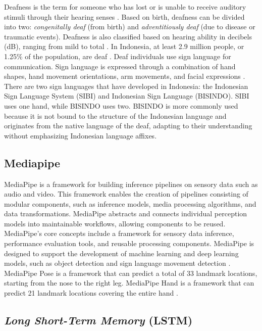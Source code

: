 Deafness is the term for someone who has lost or is unable to receive auditory stimuli through their hearing senses \cite{mursita2015}. Based on birth, deafness can be divided into two: \emph{congenitally deaf} (from birth) and \emph{adventitiously deaf} (due to disease or traumatic events). Deafness is also classified based on hearing ability in decibels (dB), ranging from mild to total \cite{winarsih2007}. In Indonesia, at least 2.9 million people, or 1.25\% of the population, are deaf \cite{evitasari2015}. Deaf individuals use sign language for communication. Sign language is expressed through a combination of hand shapes, hand movement orientations, arm movements, and facial expressions \cite{mursita2015}. There are two sign languages that have developed in Indonesia: the Indonesian Sign Language System (SIBI) and Indonesian Sign Language (BISINDO). SIBI uses one hand, while BISINDO uses two. BISINDO is more commonly used because it is not bound to the structure of the Indonesian language and originates from the native language of the deaf, adapting to their understanding without emphasizing Indonesian language affixes.

\subsection{Mediapipe}
\label{subsec:mediapipe}

MediaPipe is a framework for building inference pipelines on sensory data such as audio and video. This framework enables the creation of pipelines consisting of modular components, such as inference models, media processing algorithms, and data transformations. MediaPipe abstracts and connects individual perception models into maintainable workflows, allowing components to be reused. MediaPipe's core concepts include a framework for sensory data inference, performance evaluation tools, and reusable processing components. MediaPipe is designed to support the development of machine learning and deep learning models, such as object detection and sign language movement detection \cite{lugaresi2019:}. MediaPipe Pose is a framework that can predict a total of 33 landmark locations, starting from the nose to the right leg. MediaPipe Hand is a framework that can predict 21 landmark locations covering the entire hand \cite{googleMediapipe}.

\subsection{\emph{Long Short-Term Memory} (LSTM)}
\label{subsec:lstm}

